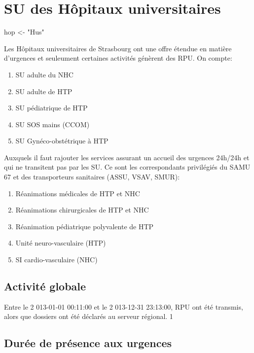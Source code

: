 \documentclass[12pt,english,french,twoside]{book}\usepackage[]{graphicx}\usepackage[]{color}
\begin{document}
\chapter{SU des Hôpitaux universitaires}


hop <- "Hus"


Les Hôpitaux universitaires de Strasbourg ont une offre étendue en matière d'urgences et seuleument certaines activités génèrent des RPU.
On compte:
\begin{enumerate}
  \item SU adulte du NHC
  \item SU adulte de HTP
  \item SU pédiatrique de HTP
  \item SU SOS mains (CCOM)
  \item SU Gynéco-obstétrique à HTP
\end{enumerate}
Auxquels il faut rajouter les services assurant un accueil des urgences 24h/24h et qui ne transitent pas par les SU. Ce sont les correspondants privilégiés du SAMU 67 et des transporteurs sanitaires (ASSU, VSAV, SMUR):
\begin{enumerate}
  \item Réanimations médicales de HTP et NHC
  \item Réanimations chirurgicales de HTP et NHC
  \item Réanimation pédiatrique polyvalente de HTP
  \item Unité neuro-vasculaire (HTP)
  \item SI cardio-vasculaire (NHC)
\end{enumerate}

\section{Activité globale}




Entre le 2 013-01-01 00:11:00 et le 2 013-12-31 23:13:00,  RPU ont été transmis, alors que  dossiers ont été déclarés au serveur régional. 
1

\section*{Durée de présence aux urgences}
\end{document}
